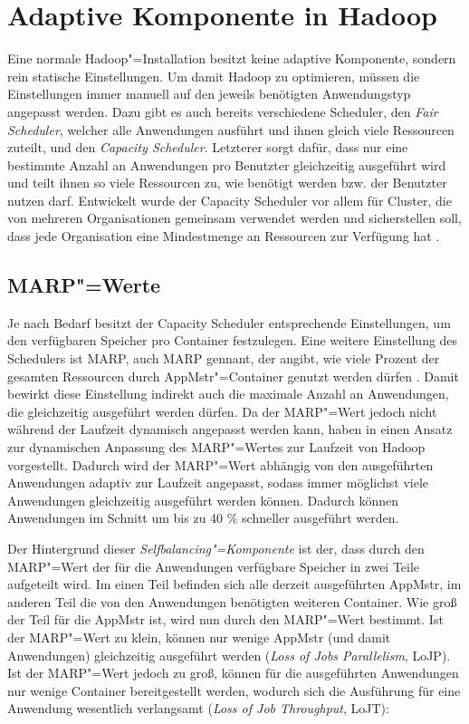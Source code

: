 \section{Adaptive Komponente in Hadoop}
\label{sec:inriaSetting}

Eine normale Hadoop"=Installation besitzt keine adaptive Komponente, sondern rein statische Einstellungen.
Um damit Hadoop zu optimieren, müssen die Einstellungen immer manuell auf den jeweils benötigten Anwendungstyp angepasst werden.
Dazu gibt es auch bereits verschiedene Scheduler, den \emph{Fair Scheduler}, welcher alle Anwendungen ausführt und ihnen gleich viele Ressourcen zuteilt, und den \emph{Capacity Scheduler}.
Letzterer sorgt dafür, dass nur eine bestimmte Anzahl an Anwendungen pro Benutzter gleichzeitig ausgeführt wird und teilt ihnen so viele Ressourcen zu, wie benötigt werden bzw. der Benutzter nutzen darf.
Entwickelt wurde der Capacity Scheduler vor allem für Cluster, die von mehreren Organisationen gemeinsam verwendet werden und sicherstellen soll, dass jede Organisation eine Mindestmenge an Ressourcen zur Verfügung hat \cite{HadoopCapScheduler271}.

\subsection{MARP"=Werte}
\label{sec:selfbalancingMarp}

Je nach Bedarf besitzt der Capacity Scheduler entsprechende Einstellungen, um \zB den verfügbaren Speicher pro Container festzulegen.
Eine weitere Einstellung des Schedulers ist \acl{MARP}, auch \acs{MARP} gennant, der angibt, wie viele Prozent der gesamten Ressourcen durch \ac{AppMstr}"=Container genutzt werden dürfen \cite{HadoopCapScheduler271}.
Damit bewirkt diese Einstellung indirekt auch die maximale Anzahl an Anwendungen, die gleichzeitig ausgeführt werden dürfen.
Da der \ac{MARP}"=Wert jedoch nicht während der Laufzeit dynamisch angepasst werden kann, haben \citeauthor{zhang2016} in \cite{zhang2016} einen Ansatz zur dynamischen Anpassung des \ac{MARP}"=Wertes zur Laufzeit von Hadoop vorgestellt.
Dadurch wird der \ac{MARP}"=Wert abhängig von den ausgeführten Anwendungen adaptiv zur Laufzeit angepasst, sodass immer möglichst viele Anwendungen gleichzeitig ausgeführt werden können.
Dadurch können Anwendungen im Schnitt um bis zu 40 \% schneller ausgeführt \cite{zhang2016} werden.

Der Hintergrund dieser \emph{Selfbalancing"=Komponente} ist der, dass durch den \ac{MARP}"=Wert der für die Anwendungen verfügbare Speicher in zwei Teile aufgeteilt wird.
Im einen Teil befinden sich alle derzeit ausgeführten \ac{AppMstr}, im anderen Teil die von den Anwendungen benötigten weiteren Container.
Wie groß der Teil für die \ac{AppMstr} ist, wird nun durch den \ac{MARP}"=Wert bestimmt.
Ist der \ac{MARP}"=Wert zu klein, können nur wenige \ac{AppMstr} (und damit Anwendungen) gleichzeitig ausgeführt werden (\emph{Loss of Jobs Parallelism}, LoJP).
Ist der \ac{MARP}"=Wert jedoch zu groß, können für die ausgeführten Anwendungen nur wenige Container bereitgestellt werden, wodurch sich die Ausführung für eine Anwendung wesentlich verlangsamt (\emph{Loss of Job Throughput}, LoJT)\cite{zhang2016}:

